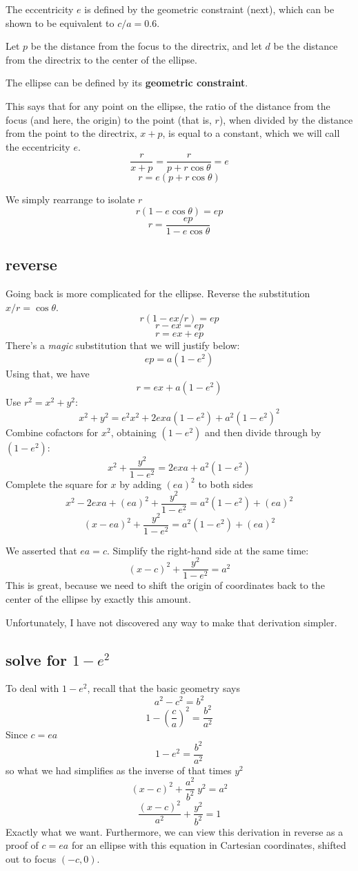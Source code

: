 \documentclass[11pt, oneside]{article}
\begin{document}
The eccentricity $e$ is defined by the geometric constraint (next), which can be shown to be equivalent to $c/a = 0.6$.  

Let $p$ be the distance from the focus to the directrix, and let $d$ be the distance from the directrix to the center of the ellipse.

The ellipse can be defined by its \textbf{geometric constraint}.

This says that for any point on the ellipse, the ratio of the distance from the focus (and here, the origin) to the point (that is, $r$), when divided by the distance from the point to the directrix, $x + p$, is equal to a constant, which we will call the eccentricity $e$.
\[ \frac{r}{x + p} = \frac{r}{p + r \cos \theta} = e \]
\[ r = e(p + r \cos \theta) \]

We simply rearrange to isolate $r$
\[ r(1 - e \cos \theta) = ep \]
\[ r = \frac{ep}{1 - e \cos \theta} \]

\subsection*{reverse}
Going back is more complicated for the ellipse. Reverse the substitution $x/r = \cos \theta$.
\[ r(1 - e x/r) = ep \]
\[ r - ex = ep \]
\[ r = ex + ep \]
There's a \emph{magic} substitution that we will justify below: 
\[ ep = a(1 - e^2) \]
Using that, we have
\[ r = ex + a(1-e^2) \]
Use $r^2 = x^2 + y^2$:
\[ x^2 + y^2 = e^2 x^2 + 2exa(1-e^2) + a^2(1- e^2)^2 \]
Combine cofactors for $x^2$, obtaining $(1-e^2)$ and then divide through by $(1-e^2)$: 
\[ x^2 + \frac{y^2}{1-e^2} = 2exa + a^2(1- e^2) \]
Complete the square for $x$ by adding $(ea)^2$ to both sides
\[ x^2 - 2exa + (ea)^2 + \frac{y^2}{1-e^2} = a^2(1- e^2) + (ea)^2 \]
\[ (x - ea)^2 + \frac{y^2}{1-e^2} = a^2(1- e^2) + (ea)^2 \]

We asserted that $ea = c$.  Simplify the right-hand side at the same time:
\[ (x - c)^2 + \frac{y^2}{1-e^2} = a^2 \]
This is great, because we need to shift the origin of coordinates back to the center of the ellipse by exactly this amount.

Unfortunately, I have not discovered any way to make that derivation simpler.  
\subsection*{solve for $1 - e^2$}

To deal with $1 - e^2$, recall that the basic geometry says
\[ a^2 - c^2 = b^2 \]
\[ 1 - (\frac{c}{a})^2 = \frac{b^2}{a^2} \]
Since $c = ea$
\[ 1 - e^2 = \frac{b^2}{a^2}  \]
so what we had simplifies as the inverse of that times $y^2$
\[ (x - c)^2 + \frac{a^2}{b^2} \ y^2 = a^2 \]
\[ \frac{(x - c)^2}{a^2} + \frac{y^2}{b^2} = 1 \]
Exactly what we want.  Furthermore, we can view this derivation in reverse as a proof of $c = ea$ for an ellipse with this equation in Cartesian coordinates, shifted out to focus $(-c,0)$.
\end{document}
